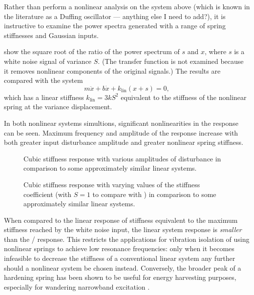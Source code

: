 Rather than perform a nonlinear analysis on the system above (which is known in the literature as a Duffing oscillator — anything else I need to add?), it is instructive to examine the power spectra generated with a range of spring stiffnesses and Gaussian inputs.

 show the square root of the ratio of the power spectrum of $s$ and $x$, where $s$ is a white noise signal of variance $S$.
(The transfer function is not examined because it removes nonlinear components of the original signals.)
The results are compared with the system
\begin{dmath}
m \ddot x + b \dot x + k_{\text{lin}}(x+s) = 0, 
\end{dmath}
which has a linear stiffness $k_{\text{lin}}=3kS^2$ equivalent to the stiffness of the nonlinear spring at the variance displacement.

In both nonlinear systems simultions, significant nonlinearities in the response can be seen.
Maximum frequency and amplitude of the response increase with both greater input disturbance amplitude and greater nonlinear spring stiffness.

\begin{figure}
  \caption{Cubic stiffness response with various amplitudes of
    disturbance in comparison to some approximately similar linear
    systems.}
\end{figure}

\begin{figure}
  \caption{Cubic stiffness response with varying values of the
    stiffness coefficient (with $S=1$ to compare with
    ) in comparison to some
    approximately similar linear systems.}
\end{figure}

When compared to the linear response of stiffness equivalent to the maximum stiffness reached by the white noise input, the linear system response is \emph{smaller} than the \qzs/ response.
This restricts the applications for vibration isolation of using nonlinear springs to achieve low resonance frequencies: only when it becomes infeasible to decrease the stiffness of a conventional linear system any further should a nonlinear system be chosen instead.
Conversely, the broader peak of a hardening spring has been shown to be useful for energy harvesting purposes, especially for wandering narrowband excitation \cite{ramlan2009-nd}.

